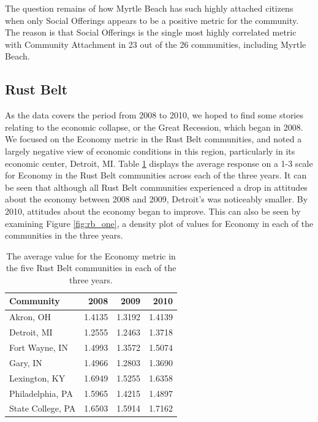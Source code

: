 \documentclass[11pt]{article}\usepackage{knitr}
\begin{document}
The question remains of how Myrtle Beach has such highly attached citizens when only Social Offerings appears to be a positive metric for the community. The reason is that Social Offerings is the single most highly correlated metric with Community Attachment in 23 out of the 26 communities, including Myrtle Beach.

\subsection*{Rust Belt}
As the data covers the period from 2008 to 2010, we hoped to find some stories relating to the economic collapse, or the Great Recession, which began in 2008. We focused on the Economy metric in the Rust Belt communities, and noted a largely negative view of economic conditions in this region, particularly in its economic center, Detroit, MI. Table \ref{tbl:econ} displays the average response on a 1-3 scale for Economy in the Rust Belt communities across each of the three years. It can be seen that although all Rust Belt communities experienced a drop in attitudes about the economy between 2008 and 2009, Detroit's was noticeably smaller. By 2010, attitudes about the economy began to improve. This can also be seen by examining Figure \ref{fig:rb_one}, a density plot of values for Economy in each of the communities in the three years.

\begin{table}[ht]
\centering
\begin{tabular}{lrrr}
  \hline
Community & 2008 & 2009 & 2010 \\ 
  \hline
Akron, OH & 1.4135 & 1.3192 & 1.4139 \\ 
  Detroit, MI & 1.2555 & 1.2463 & 1.3718 \\ 
  Fort Wayne, IN & 1.4993 & 1.3572 & 1.5074 \\ 
  Gary, IN & 1.4966 & 1.2803 & 1.3690 \\ 
  Lexington, KY & 1.6949 & 1.5255 & 1.6358 \\ 
  Philadelphia, PA & 1.5965 & 1.4215 & 1.4897 \\ 
  State College, PA & 1.6503 & 1.5914 & 1.7162 \\ 
   \hline
\end{tabular}
\caption{The average value for the Economy metric in the five Rust Belt communities in each of the three years.} 
\label{tbl:econ}
\end{table}
\end{document}
